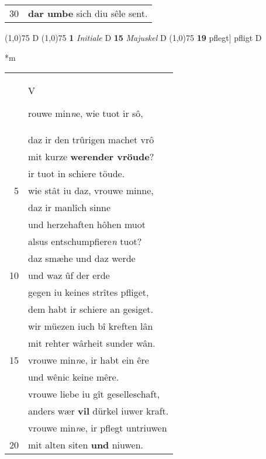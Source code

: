 \documentclass[8pt,a4paper,notitlepage]{article}
\begin{document}
\begin{table}[ht]
\begin{minipage}[t]{0.5\linewidth}
\begin{tabular}{rl}
30 & \textbf{dar umbe} sich diu sêle sent.\\ 
\end{tabular}
\scriptsize
\line(1,0){75} \newline
D \newline
\line(1,0){75} \newline
\textbf{1} \textit{Initiale} D  \textbf{15} \textit{Majuskel} D  \newline
\line(1,0){75} \newline
\textbf{19} pflegt] pfligt D \newline
\end{minipage}
\hspace{0.5cm}
\begin{minipage}[t]{0.5\linewidth}
\small
\begin{center}*m
\end{center}
\begin{tabular}{rl}
 & \begin{large}V\end{large}rouwe min\textit{n}e, wie tuot ir sô,\\ 
 & daz ir den trûrigen machet vrô\\ 
 & mit kurze \textbf{werender vröude}?\\ 
 & ir tuot in schiere töude.\\ 
5 & wie stât iu daz, vrouwe minne,\\ 
 & daz ir manlîch sinne\\ 
 & und herzehaften hôhen muot\\ 
 & alsus entschumpfiere\textit{n} tuot?\\ 
 & daz smæhe und daz werde\\ 
10 & und waz ûf der erde\\ 
 & gegen iu keines strîtes pfliget,\\ 
 & dem habt ir schiere an gesiget.\\ 
 & wir müezen iuch bî kreften lân\\ 
 & mit rehter wârheit sunder wân.\\ 
15 & vrouwe min\textit{n}e, ir habt ein êre\\ 
 & und wênic keine mêre.\\ 
 & vrouwe liebe iu gît geselleschaft,\\ 
 & anders wær \textbf{vil} dürkel iuwer kraft.\\ 
 & vrouwe min\textit{n}e, ir pflegt untriuwen\\ 
20 & mit alten siten \textbf{und} niuwen.\\ 

\end{tabular}
\end{minipage}
\end{table}
\end{document}
